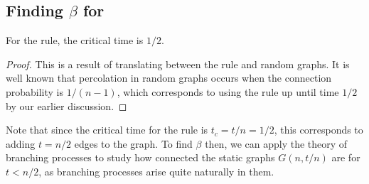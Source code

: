 \documentclass[twoside,10pt]{article}
\begin{document}
\pagebreak

\subsection{Finding \texorpdfstring{$\beta$}{beta} for \ER}
\label{finding-beta}

\begin{lem}
	For the \ER rule, the critical time is $1/2$.
\end{lem}
\begin{proof}
	This is a result of translating between the \ER rule and \ER random graphs. It is well known \cite{princeton} that percolation in \ER random graphs occurs when the connection probability is $1/(n-1)$, which corresponds to using the \ER rule up until time $1/2$ by our earlier discussion.
\end{proof}

Note that since the critical time for the \ER rule is $t_c = t/n = 1/2$, this corresponds to adding $t=n/2$ edges to the graph. To find $\beta$ then, we can apply the theory of branching processes to study how connected the static graphs $G(n,t/n)$ are for $t < n/2$, as branching processes arise quite naturally in them.
\end{document}

